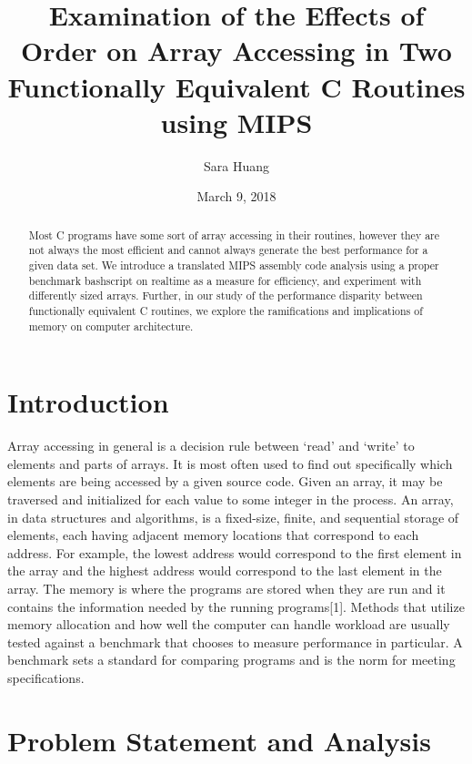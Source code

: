 \documentclass[a4paper]{article}
\title{Examination of the Effects of Order on Array Accessing in Two Functionally Equivalent C Routines using MIPS}
\author{Sara Huang}
\date{March 9, 2018}
\begin{document}
\maketitle

\begin{abstract}
Most C programs have some sort of array accessing in their routines, however they are not always the most efficient and cannot always generate the best performance for a given data set. We introduce a translated MIPS assembly code analysis using a proper benchmark bashscript on realtime as a measure for efficiency, and experiment with differently sized arrays. Further, in our study of the performance disparity between functionally equivalent C routines, we explore the ramifications and implications of memory on computer architecture.
\end{abstract}

\section{Introduction}

Array accessing in general is a decision rule between ‘read’ and ‘write’ to elements and parts of arrays. It is most often used to find out specifically which elements are being accessed by a given source code. Given an array, it may be traversed and initialized for each value to some integer in the process. An array, in data structures and algorithms, is a fixed-size, finite, and sequential storage of elements, each having adjacent memory locations that correspond to each address. For example, the lowest address would correspond to the first element in the array and the highest address would correspond to the last element in the array. The memory is where the programs are stored when they are run and it contains the information needed by the running programs[1]. Methods that utilize memory allocation and how well the computer can handle workload are usually tested against a benchmark that chooses to measure performance in particular. A benchmark sets a standard for comparing programs and is the norm for meeting specifications. 

\section{Problem Statement and Analysis}
\end{document}

